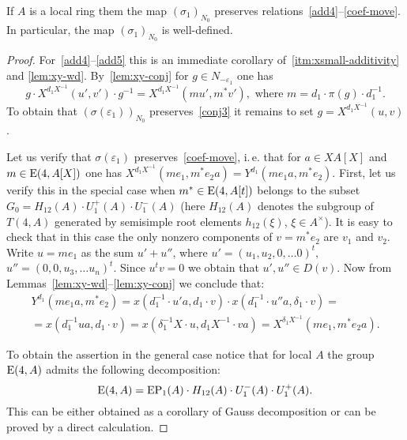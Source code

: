 \begin{prop}
    If $A$ is a local ring them the map $(\sigma_1)_{N_0}$ preserves relations~\eqref{add4}--\eqref{coef-move}.
    In particular, the map $(\sigma_1)_{N_0}$ is well-defined.
\end{prop}
\begin{proof}
    For~\eqref{add4}--\eqref{add5} this is an immediate corollary of~\cref{itm:xsmall-additivity} and \cref{lem:xy-wd}.
    By~\cref{lem:xy-conj} for $g \in N_{-\varepsilon_1}$ one has
    \begin{equation}
        \label{eq:xy-conj-n1}
        g \cdot X^{d_1 X^{-1}}(u', v') \cdot g^{-1} = X^{d_1 X^{-1}}(mu', m^*v'), \text{ where } m = d_1 \cdot \pi(g) \cdot d_1^{-1}.
    \end{equation}
    To obtain that $(\sigma(\varepsilon_1))_{N_0}$ preserves~\eqref{conj3} it remains to set $g = X^{d_1 X^{-1}}(u, v)$.

    Let us verify that $\sigma(\varepsilon_1)$ preserves~\eqref{coef-move}, i.\,e. that for $a\in XA[X]$ and $m \in \operatorname{E}(4, A[X])$ one has
    $X^{d_1 X^{-1}}(me_1, m^*e_2 a) = Y^{d_1}(me_1 a, m^* e_2)$.
    First, let us verify this in the special case when $m^* \in \operatorname{E}(4, A[t])$ belongs to the subset $G_0 = H_{12}(A) \cdot U^+_1(A) \cdot U^-_1(A)$
    (here $H_{12}(A)$ denotes the subgroup of $T(4, A)$ generated by semisimple root elements $h_{12}(\xi)$, $\xi \in A^\times$).
    It is easy to check that in this case the only nonzero components of $v = m^* e_2$ are $v_1$ and $v_2$.
    Write $u = m e_1$ as the sum $u' + u''$, where $u' = (u_1, u_2, 0, \ldots 0)^t,$ $u'' = (0, 0, u_3, \ldots u_n)^t$.
    Since $u^t v = 0$ we obtain that $u', u'' \in D(v)$.
    Now from Lemmas~\ref{lem:xy-wd}--\ref{lem:xy-conj} we conclude that:
    \begin{multline}
        \label{eq:special-case}
        Y^{d_1}(me_{1}a, m^* e_2) = x(d_1^{-1} \cdot u'a, d_1\cdot  v) \cdot x(d_1^{-1}\cdot u''a, \delta_1 \cdot v) = \\
        = x(d_1^{-1} ua, d_1 \cdot v) = x(\delta_1^{-1}X \cdot u, d_{1}X^{-1} \cdot v a) = X^{\delta_1 X^{-1}}(me_1, m^*e_2 a).
    \end{multline}

    To obtain the assertion in the general case notice that for local $A$ the group $\operatorname{E}(4, A)$ admits the following decomposition:
    \[\operatorname{E}(4, A) = \mathrm{EP}_1(A) \cdot H_{12}(A) \cdot U^-_1(A) \cdot U^+_1(A).\]
    This can be either obtained as a corollary of Gauss decomposition or can be proved by a direct calculation. %


\end{proof}
